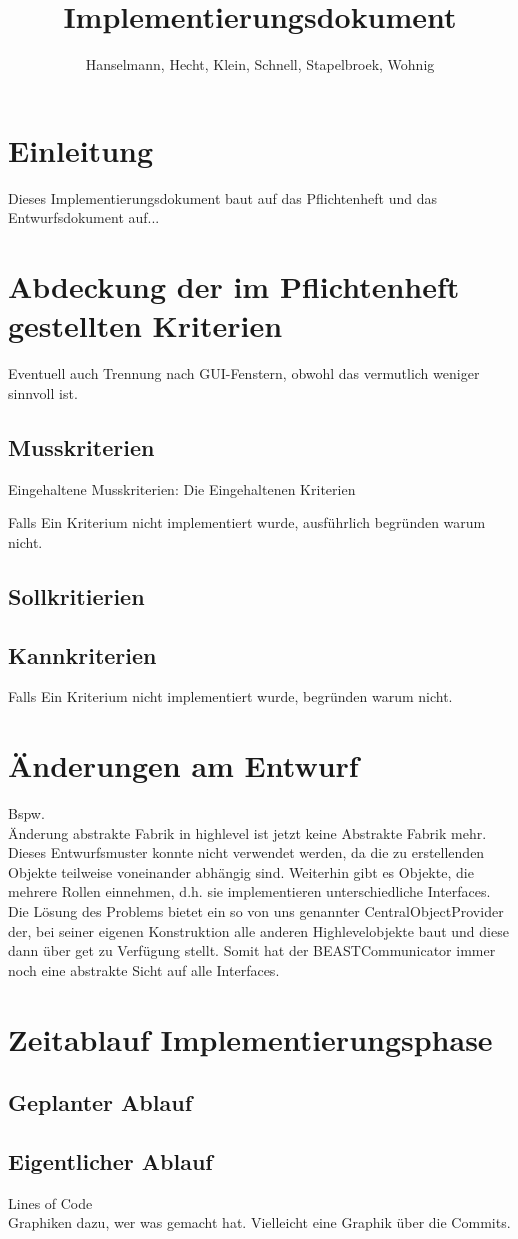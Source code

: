 \documentclass[a4paper]{scrreprt}
\begin{document}
\title{Implementierungsdokument}
\author{Hanselmann, Hecht, Klein, Schnell, Stapelbroek, Wohnig}
\maketitle 
\tableofcontents	

\chapter{Einleitung}
Dieses Implementierungsdokument baut auf das Pflichtenheft und das Entwurfsdokument auf...

\chapter{Abdeckung der im Pflichtenheft gestellten Kriterien}

Eventuell auch Trennung nach GUI-Fenstern, obwohl das vermutlich weniger sinnvoll ist.
\section{Musskriterien}
Eingehaltene Musskriterien: 
Die Eingehaltenen Kriterien

Falls Ein Kriterium nicht implementiert wurde, ausführlich begründen warum nicht.




\section{Sollkritierien}
\section{Kannkriterien}
Falls Ein Kriterium nicht implementiert wurde, begründen warum nicht. 

\chapter{Änderungen am Entwurf}
Bspw. \\
Änderung abstrakte Fabrik in highlevel ist jetzt keine Abstrakte Fabrik mehr.\\ Dieses Entwurfsmuster konnte nicht verwendet werden, da die zu erstellenden Objekte teilweise voneinander abhängig sind. Weiterhin gibt es Objekte, die mehrere Rollen einnehmen, d.h. sie implementieren unterschiedliche Interfaces. \\
Die Lösung des Problems bietet ein so von uns genannter CentralObjectProvider der, bei seiner eigenen Konstruktion alle anderen Highlevelobjekte baut und diese dann über get zu Verfügung stellt.
Somit hat der BEASTCommunicator immer noch eine abstrakte Sicht auf alle Interfaces.

\chapter{Zeitablauf Implementierungsphase}

\section{Geplanter Ablauf}
\section{Eigentlicher Ablauf}
Lines of Code\\
Graphiken dazu, wer was gemacht hat.
Vielleicht eine Graphik über die Commits.
\end{document}
